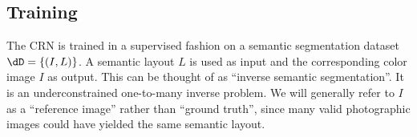 


\subsection{Training}

The CRN is trained in a supervised fashion on a semantic segmentation dataset $\dD = \{(I,L)\}$. A semantic layout $L$ is used as input and the corresponding color image $I$ as output. This can be thought of as ``inverse semantic segmentation''. It is an underconstrained one-to-many inverse problem. We will generally refer to $I$ as a ``reference image'' rather than ``ground truth'', since many valid photographic images could have yielded the same semantic layout.


